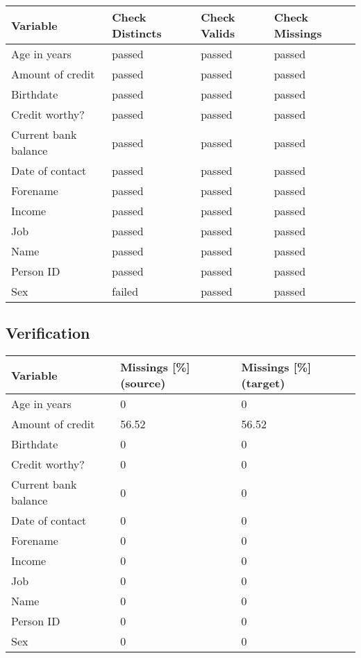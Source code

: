 \documentclass[
]{article}
\begin{document}
\begin{table}[H]
\centering
\begin{tabular}{l|l|l|l}
\hline
\textbf{Variable} & \textbf{Check Distincts} & \textbf{Check Valids} & \textbf{Check Missings}\\
\hline
Age in years & passed & passed & passed\\
\hline
Amount of credit & passed & passed & passed\\
\hline
Birthdate & passed & passed & passed\\
\hline
Credit worthy? & passed & passed & passed\\
\hline
Current bank balance & passed & passed & passed\\
\hline
Date of contact & passed & passed & passed\\
\hline
Forename & passed & passed & passed\\
\hline
Income & passed & passed & passed\\
\hline
Job & passed & passed & passed\\
\hline
Name & passed & passed & passed\\
\hline
Person ID & passed & passed & passed\\
\hline
Sex & failed & passed & passed\\
\hline
\end{tabular}
\end{table}

\hypertarget{verification}{%
\subsection{Verification}\label{verification}}

\begin{table}[H]
\centering
\begin{tabular}{l|l|l}
\hline
\textbf{Variable} & \textbf{Missings [\%] (source)} & \textbf{Missings [\%] (target)}\\
\hline
Age in years & 0 & 0\\
\hline
Amount of credit & 56.52 & 56.52\\
\hline
Birthdate & 0 & 0\\
\hline
Credit worthy? & 0 & 0\\
\hline
Current bank balance & 0 & 0\\
\hline
Date of contact & 0 & 0\\
\hline
Forename & 0 & 0\\
\hline
Income & 0 & 0\\
\hline
Job & 0 & 0\\
\hline
Name & 0 & 0\\
\hline
Person ID & 0 & 0\\
\hline
Sex & 0 & 0\\
\hline
\end{tabular}
\end{table}
\end{document}
